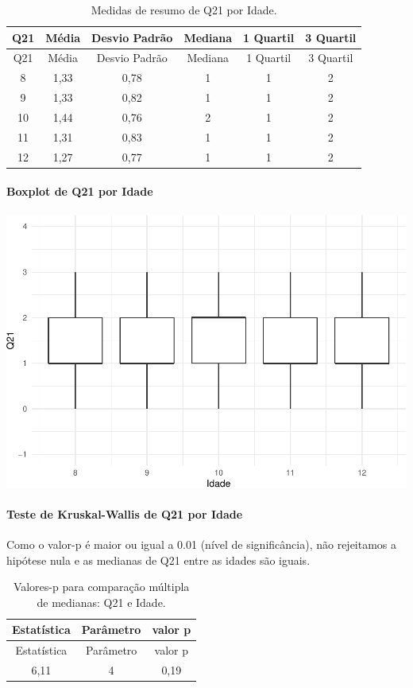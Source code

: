 \documentclass[]{article}
\let\oldparagraph\paragraph
\renewcommand{\paragraph}[1]{\oldparagraph{#1}\mbox{}}
\begin{document}
\begin{longtable}[]{@{}cccccc@{}}
\caption{\label{tab:unnamed-chunk-450}Medidas de resumo de Q21 por Idade.}\tabularnewline
\toprule
Q21 & Média & Desvio Padrão & Mediana & 1 Quartil & 3 Quartil\tabularnewline
\midrule
\endfirsthead
\toprule
Q21 & Média & Desvio Padrão & Mediana & 1 Quartil & 3 Quartil\tabularnewline
\midrule
\endhead
8 & 1,33 & 0,78 & 1 & 1 & 2\tabularnewline
9 & 1,33 & 0,82 & 1 & 1 & 2\tabularnewline
10 & 1,44 & 0,76 & 2 & 1 & 2\tabularnewline
11 & 1,31 & 0,83 & 1 & 1 & 2\tabularnewline
12 & 1,27 & 0,77 & 1 & 1 & 2\tabularnewline
\bottomrule
\end{longtable}

\hypertarget{boxplot-de-q21-por-idade}{%
\paragraph{Boxplot de Q21 por Idade}\label{boxplot-de-q21-por-idade}}

\begin{center}\includegraphics[width=0.75\linewidth]{relatorio_covid19_files/figure-latex/unnamed-chunk-451-1} \end{center}

\hypertarget{teste-de-kruskal-wallis-de-q21-por-idade}{%
\paragraph{Teste de Kruskal-Wallis de Q21 por Idade}\label{teste-de-kruskal-wallis-de-q21-por-idade}}

Como o valor-p é maior ou igual a 0.01 (nível de significância), não rejeitamos a hipótese nula e as medianas de Q21 entre as idades são iguais.

\begin{longtable}[]{@{}ccc@{}}
\caption{\label{tab:unnamed-chunk-453}Valores-p para comparação múltipla de medianas: Q21 e Idade.}\tabularnewline
\toprule
Estatística & Parâmetro & valor p\tabularnewline
\midrule
\endfirsthead
\toprule
Estatística & Parâmetro & valor p\tabularnewline
\midrule
\endhead
6,11 & 4 & 0,19\tabularnewline
\bottomrule
\end{longtable}
\end{document}
